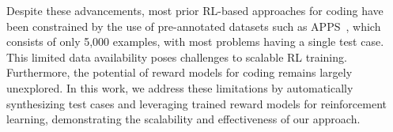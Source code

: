 Despite these advancements, most prior RL-based approaches for coding have been constrained by the use of pre-annotated datasets such as APPS~\citep{APPS}, which consists of only 5,000 examples, with most problems having a single test case. This limited data availability poses challenges to scalable RL training. Furthermore, the potential of reward models for coding remains largely unexplored. In this work, we address these limitations by automatically synthesizing test cases and leveraging trained reward models for reinforcement learning, demonstrating the scalability and effectiveness of our approach.



